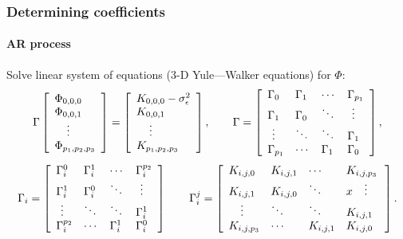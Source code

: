 \documentclass[14pt,aspectratio=169]{beamer}
\newcommand{\Var}[1]{\sigma_{#1}^2}
\begin{document}
	\begin{frame}
		\frametitle{Determining coefficients}
		\framesubtitle{AR process}
		\small%
		Solve linear system of equations (3-D Yule---Walker equations) for $\Phi$:
		\begin{equation*}
		    \Gamma
		    \left[
		        \begin{array}{l}
		            \Phi_{0,0,0}\\
		            \Phi_{0,0,1}\\
		            \vdotswithin{\Phi_{0,0,0}}\\
		            \Phi_{p_1,p_2,p_3}
		        \end{array}
		    \right]
		    = 
		    \left[
		        \begin{array}{l}
		            K_{0,0,0}-\Var{\epsilon}\\
		            K_{0,0,1}\\
		            \vdotswithin{K_{0,0,0}}\\
		            K_{p_1,p_2,p_3}
		        \end{array}
		    \right],
		    \qquad
		    \Gamma=
		    \left[
		        \begin{array}{llll}
		            \Gamma_0 & \Gamma_1 & \cdots & \Gamma_{p_1} \\
		            \Gamma_1 & \Gamma_0 & \ddots & \vdotswithin{\Gamma_0} \\
		            \vdotswithin{\Gamma_0} & \ddots & \ddots & \Gamma_1 \\
		            \Gamma_{p_1} & \cdots & \Gamma_1 & \Gamma_0
		        \end{array}
		    \right],
		\end{equation*}
		\begin{equation*}
			\Gamma_i = 
			\left[
			\begin{array}{llll}
				\Gamma^0_i & \Gamma^1_i & \cdots & \Gamma^{p_2}_i \\
				\Gamma^1_i & \Gamma^0_i & \ddots & \vdotswithin{\Gamma^0_i} \\
				\vdotswithin{\Gamma^0_i} & \ddots & \ddots & \Gamma^1_i \\
				\Gamma^{p_2}_i & \cdots & \Gamma^1_i & \Gamma^0_i
			\end{array}
			\right]
			\qquad
			\Gamma_i^j= 
			\left[
			\begin{array}{llll}
				K_{i,j,0} & K_{i,j,1} & \cdots & K_{i,j,p_3} \\
				K_{i,j,1} & K_{i,j,0} & \ddots &x \vdotswithin{K_{i,j,0}} \\
				\vdotswithin{K_{i,j,0}} & \ddots & \ddots & K_{i,j,1} \\
				K_{i,j,p_3} & \cdots & K_{i,j,1} & K_{i,j,0}
			\end{array}
			\right].
		\end{equation*}
	\end{frame}
\end{document}

